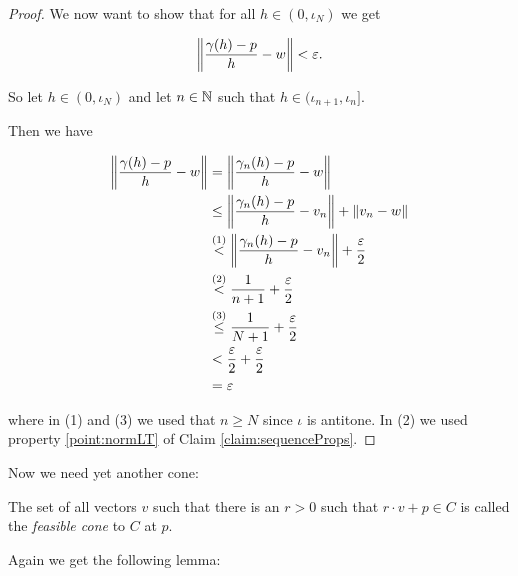 \begin{proof}
We now want to show that for all $h \in (0, \iota_N)$ we get 

\begin{equation*}
    \left\lVert\frac{\gamma (h) - p}{h} - w\right\rVert < \varepsilon.  
\end{equation*}

So let $h \in (0, \iota_N)$ and let $n \in \mathbb{N}$ such that $h \in (\iota_{n + 1}, \iota_n]$. 

Then we have 

\begin{equation*}
\begin{split}
\left\lVert\frac{\gamma (h) - p}{h} - w\right\rVert &= \left\lVert\frac{\gamma_n (h) - p}{h} - w\right\rVert \\
&\le \left\lVert\frac{\gamma_n (h) - p}{h} - v_n\right\rVert + \left\lVert v_n - w\right\rVert \\
&\stackrel{(1)}{<} \left\lVert\frac{\gamma_n (h) - p}{h} - v_n\right\rVert + \frac{\varepsilon}{2} \\
&\stackrel{(2)}{<} \frac{1}{n + 1} + \frac{\varepsilon}{2} \\
&\stackrel{(3)}{\le} \frac{1}{N + 1} + \frac{\varepsilon}{2} \\
&< \frac{\varepsilon}{2} + \frac{\varepsilon}{2} \\
&= \varepsilon \\
\end{split}
\end{equation*}

where in (1) and (3) we used that $n \ge N$ since $\iota$ is antitone.
In (2) we used property \ref{point:normLT} of Claim \ref{claim:sequenceProps}. 

\end{proof}

Now we need yet another cone: 

\begin{defi}
The set of all vectors $v$ such that there is an $r > 0$ such that $r \cdot v + p \in C$ is called the \emph{feasible cone} to $C$ at $p$.
\end{defi}

Again we get the following lemma: 

